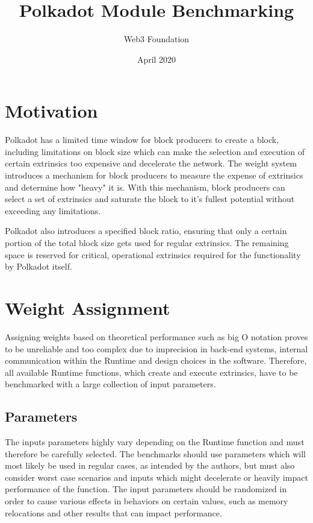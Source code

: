 \documentclass[11pt,a4paper]{article}
\begin{document}
\title{Polkadot Module Benchmarking}
\author{Web3 Foundation}
\date{April 2020}
\maketitle

\section{Motivation}
Polkadot has a limited time window for block producers to create a block,
including limitations on block size which can make the selection and execution
of certain extrinsics too expensive and decelerate the network. The weight
system introduces a mechanism for block producers to measure the expense of
extrinsics and determine how "heavy" it is. With this mechanism, block producers
can select a set of extrinsics and saturate the block to it's fullest potential
without exceeding any limitations.
\newline

Polkadot also introduces a specified block ratio, ensuring that only a certain
portion of the total block size gets used for regular extrinsics. The remaining
space is reserved for critical, operational extrinsics required for the functionality 
by Polkadot itself.

\section{Weight Assignment}
Assigning weights based on theoretical performance such as big O notation proves to be
unreliable and too complex due to imprecision in back-end systems, internal communication
within the Runtime and design choices in the software. Therefore, all available Runtime 
functions, which create and execute extrinsics, have to be benchmarked with a large
collection of input parameters.

\subsection{Parameters}
The inputs parameters highly vary depending on the Runtime function and must therefore
be carefully selected. The benchmarks should use parameters which will most likely be
used in regular cases, as intended by the authors, but must also consider worst case
scenarios and inputs which might decelerate or heavily impact performance of the function.
The input parameters should be randomized in order to cause various effects in behaviors
on certain values, such as memory relocations and other results that can impact performance.
\end{document}
